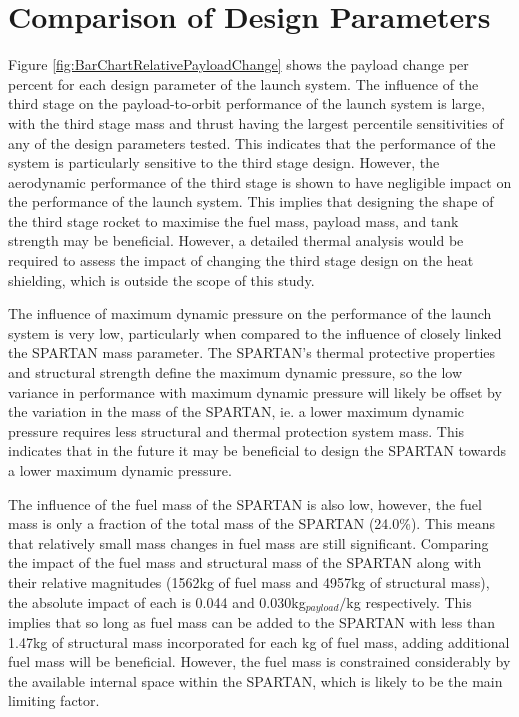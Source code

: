 \section{Comparison of Design Parameters}

Figure \ref{fig:BarChartRelativePayloadChange} shows the payload change per percent for each design parameter of the launch system. 
The influence of the third stage on the payload-to-orbit performance of the launch system is large, with the third stage mass and thrust having the largest percentile sensitivities of any of the design parameters tested. This indicates that the performance of the system is particularly sensitive to the third stage design. However, the aerodynamic performance of the third stage is shown to have negligible impact on the performance of the launch system. This implies that designing the shape of the third stage rocket to maximise the fuel mass, payload mass, and tank strength may be beneficial. However, a detailed thermal analysis would be required to assess the impact of changing the third stage design on the heat shielding, which is outside the scope of this study.  


The influence of maximum dynamic pressure on the performance of the launch system is very low, particularly when compared to the influence of closely linked the SPARTAN mass parameter. The SPARTAN's thermal protective properties and structural strength define the maximum dynamic pressure, so the low variance in performance with maximum dynamic pressure will likely be offset by the variation in the mass of the SPARTAN, ie. a lower maximum dynamic pressure requires less structural and thermal protection system mass. This indicates that in the future it may be beneficial to design the SPARTAN towards a lower maximum dynamic pressure.

The influence of the fuel mass of the SPARTAN is also low, however, the fuel mass is only a fraction of the total mass of the SPARTAN (24.0\%). This means that relatively small mass changes in fuel mass are still significant. Comparing the impact of the fuel mass and structural mass of the SPARTAN along with their relative magnitudes (1562kg of fuel mass and 4957kg of structural mass), the absolute impact of each is 0.044 and 0.030kg$_{payload}/$kg respectively. This implies that so long as fuel mass can be added to the SPARTAN with less than 1.47kg of structural mass incorporated for each kg of fuel mass, adding additional fuel mass will be beneficial. However, the fuel mass is constrained considerably by the available internal space within the SPARTAN, which is likely to be the main limiting factor.



